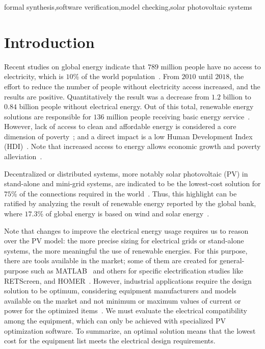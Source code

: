 \documentclass[a4paper,donotrepeattitle,fleqn]{cas-dc}
\begin{document}
\begin{keywords}
formal synthesis\sep software verification\sep model checking\sep solar photovoltaic systems
\end{keywords}


\maketitle

\section{Introduction}
Recent studies on global energy indicate that $789$ million people have no access to electricity, which is $10$\% of the world population~\cite{Energyprogressreport}. From $2010$ until $2018$, the effort to reduce the number of people without electricity access increased, and the results are positive. Quantitatively the result was a decrease from $1.2$ billion to $0.84$ billion people without electrical energy. Out of this total, renewable energy solutions are responsible for $136$ million people receiving basic energy service~\cite{Energyprogressreport}. However, lack of access to clean and affordable energy is considered a core dimension of poverty~\cite{Hussein2012}; and a direct impact is a low Human Development Index (HDI)~\cite{Coelho}. Note that increased access to energy allows economic growth and poverty alleviation~\cite{Karekesi}. 
 
Decentralized or distributed systems, more notably solar photovoltaic (PV) in stand-alone and mini-grid systems, are indicated to be the lowest-cost solution for $75$\% of the connections required in the world~\cite {Hussein2012}. Thus, this highlight can be ratified by analyzing the result of renewable energy reported by the global bank, where $17.3$\% of global energy is based on wind and solar energy~\cite{Energyprogressreport}. 

Note that changes to improve the electrical energy usage requires us to reason over the PV model: the more precise sizing for electrical grids or stand-alone systems, the more meaningful the use of renewable energies. For this purpose, there are tools available in the market; some of them are created for general-purpose such as MATLAB~\cite{Benatiallah2017} and others for specific electrification studies like RETScreen, and HOMER~\cite{Pradhan,Swarnkar}. However, industrial applications require the design solution to be optimum, considering equipment manufacturers and models available on the market and not minimum or maximum values of current or power for the optimized items~\cite{DBLP:journals/corr/abs-1909-13139, Applasamy2011}. We must evaluate the electrical compatibility among the equipment, which can only be achieved with specialized PV optimization software. To summarize, an optimal solution means that the lowest cost for the equipment list meets the electrical design requirements.
 
\end{document}
